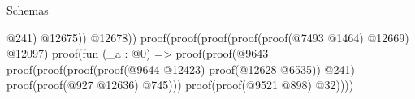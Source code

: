 \begin{lexlean}{Schemas}
\begin{coremodule}
                                                                                                                        @241)
                                                                                                                      @12675))
                                                                                                                @12678))
                                                                                                          proof(proof(proof(proof(proof(@7493
                                                                                                                      @1464)
                                                                                                                    @12669)
                                                                                                                  @12097)
                                                                                                                proof(fun (_a : @0) =>
                                                                                                                  proof(proof(@9643
                                                                                                                        proof(proof(proof(proof(@9644
                                                                                                                                  @12423)
                                                                                                                                proof(@12628
                                                                                                                                    @6535))
                                                                                                                              @241)
                                                                                                                            proof(proof(@927
                                                                                                                                  @12636)
                                                                                                                                @745)))
                                                                                                                      proof(proof(@9521
                                                                                                                            @898)
                                                                                                                          @32))))

\end{coremodule}
\end{lexlean}

